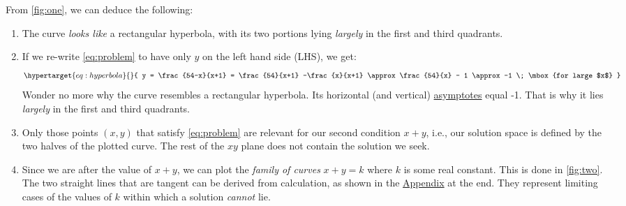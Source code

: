 \documentclass[
  a4paper,
]{article}
\begin{document}
From \cref{fig:one}, we can deduce the following:

\begin{enumerate}
\def\labelenumi{(\alph{enumi})}
\item
  The curve \emph{looks like} a rectangular hyperbola, with its two
  portions lying \emph{largely} in the first and third quadrants.
\item
  If we re-write \cref{eq:problem} to have only \(y\) on the left hand
  side (LHS), we get:
  \begin{equation}\protect\hypertarget{eq:hyperbola}{}{
  y = \frac{54-x}{x+1} = \frac{54}{x+1} -\frac{x}{x+1} \approx \frac{54}{x} - 1 \approx -1 \; \mbox{for large $x$}
  }\label{eq:hyperbola}\end{equation} Wonder no more why the curve
  resembles a rectangular hyperbola. Its horizontal (and vertical)
  \href{https://en.wikipedia.org/wiki/Asymptote}{asymptotes} equal -1.
  That is why it lies \emph{largely} in the first and third quadrants.
\item
  Only those points \((x, y)\) that satisfy \cref{eq:problem} are
  relevant for our second condition \(x + y\), i.e., our solution space
  is defined by the two halves of the plotted curve. The rest of the
  \(xy\) plane does not contain the solution we seek.
\item
  Since we are after the value of \(x + y\), we can plot the
  \emph{family of curves} \(x + y = k\) where \(k\) is some real
  constant. This is done in \cref{fig:two}. The two straight lines that
  are tangent can be derived from calculation, as shown in the
  \protect\hyperlink{appendix}{Appendix} at the end. They represent
  limiting cases of the values of \(k\) within which a solution
  \emph{cannot} lie.
\end{enumerate}
\end{document}
